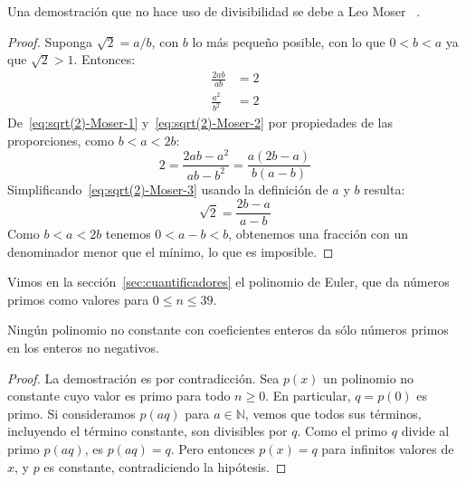  Una demostración
  que no hace uso de divisibilidad se debe a Leo Moser~%
    \cite{moser04:_introd_theor_number}.%
  \begin{proof}
    Suponga \(\sqrt{2} = a / b\),
    con \(b\) lo más pequeño posible,
    con lo que \(0 < b < a\) ya que \(\sqrt{2} > 1\).
    Entonces:
    \begin{align}
      \frac{2 a b}{a b}
	&= 2 \label{eq:sqrt(2)-Moser-1} \\
      \frac{a^2}{b^2}
	&= 2 \label{eq:sqrt(2)-Moser-2}
    \end{align}
    De~\eqref{eq:sqrt(2)-Moser-1} y~\eqref{eq:sqrt(2)-Moser-2}
    por propiedades de las proporciones,%
    como \(b < a < 2 b\):
    \begin{equation}
      \label{eq:sqrt(2)-Moser-3}
      2
	= \frac{2 a b - a^2}{a b - b^2}
	= \frac{a (2 b - a)}{b (a - b)}
    \end{equation}
    Simplificando~\eqref{eq:sqrt(2)-Moser-3}
    usando la definición de \(a\) y \(b\) resulta:
    \begin{equation*}
      \sqrt{2}
	= \frac{2 b - a}{a - b}
    \end{equation*}
    Como \(b < a < 2 b\) tenemos \(0 < a - b < b\),
    obtenemos una fracción con un denominador menor que el mínimo,
    lo que es imposible.
  \end{proof}

  Vimos en la sección~\ref{sec:cuantificadores}
  el polinomio de Euler,%
  que da números primos como valores para \(0 \le n \le 39\).
  \begin{proposition}
    Ningún polinomio no constante con coeficientes enteros
    da sólo números primos en los enteros no negativos.
  \end{proposition}
  \begin{proof}
    La demostración es por contradicción.%
    Sea \(p(x)\) un polinomio no constante
    cuyo valor es primo para todo \(n \ge 0\).
    En particular,
    \(q = p(0)\) es primo.
    Si consideramos \(p(a q)\) para \(a \in \mathbb{N}\),
    vemos que todos sus términos,
    incluyendo el término constante,
    son divisibles por \(q\).
    Como el primo \(q\) divide al primo \(p(a q)\),
    es \(p(a q) = q\).
    Pero entonces \(p(x) = q\) para infinitos valores de \(x\),
    y \(p\) es constante,
    contradiciendo la hipótesis.
  \end{proof}

